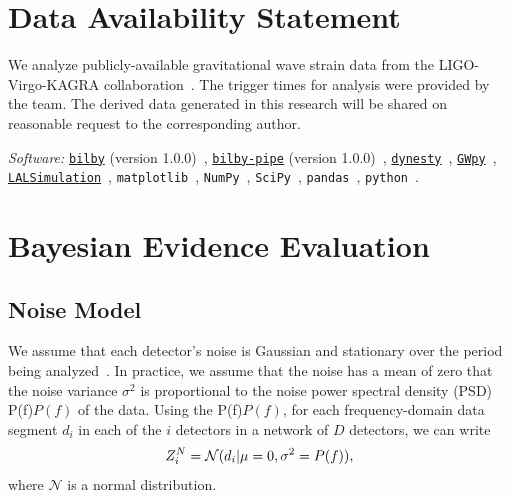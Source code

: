 \documentclass[
 nofootinbib,
 amsmath,amssymb,
 aps,
 twocolumn,
 superscriptaddress
]{revtex4-2}
\newcommand{\code}[1]{{\texttt{#1}}\xspace}
\newcommand{\bilby}{\code{bilby}}
\newcommand{\bilbypipe}{\code{bilby-pipe}}
\newcommand{\dynesty}{\code{dynesty}}
\newcommand{\gwpy}{\code{GWpy}}
\newcommand{\pycbc}{{\sc {{PyCBC}}}\xspace}
\newcommand{\mathcmd}[1]{{\sc \relax\ifmmode#1\else $#1$\fi}\xspace}
\newcommand{\psd}{\mathcmd{P(f)}}
\begin{document}
\section*{Data Availability Statement}
{
We analyze publicly-available gravitational wave strain data from the LIGO-Virgo-KAGRA collaboration~\cite{O2data}. The trigger times for analysis were provided by the \pycbc team. The derived data generated in this research will be shared on reasonable request to the corresponding author.

\textit{Software:} \href{https://lscsoft.docs.ligo.org/bilby/}{\bilby} (version 1.0.0)~\cite{bilby}, \href{https://lscsoft.docs.ligo.org/bilby_pipe/master/index.html}{\bilbypipe} (version 1.0.0)~\cite{bilby_pipe}, \href{https://dynesty.readthedocs.io/}{\dynesty}~\cite{dynesty, skilling2004, skilling2006}, \href{https://gwpy.github.io/docs/stable/index.html}{\gwpy}~\cite{gwpy}, \href{https://lscsoft.docs.ligo.org/lalsuite/lalsimulation/index.html}{\code{LALSimulation}}~\cite{lalsuite}, \code{matplotlib}~\cite{matplotlib}, \code{NumPy}~\cite{NumPy}, \code{SciPy}~\cite{SciPy}, \code{pandas}~\cite{pandas}, \code{python}~\cite{pythonForScientificComputing,pythonForScientists}. 
}



\appendix



\section{Bayesian Evidence Evaluation}\label{sec:bayesianEvidEval}

\subsection{Noise Model}
We assume that each detector's noise is Gaussian and stationary over the period being analyzed~\cite{ligo_psd}. In practice, we assume that the noise has a mean of zero that the noise variance $\sigma^2$ is proportional to the noise power spectral density (PSD) \psd of the data. Using the \psd, for each frequency-domain data segment $d_i$ in each of the $i$ detectors in a network of $D$ detectors, we can write 
\begin{equation}
\label{eq:zn}
Z^N_i = \mathcal{N}(d_i|\mu=0,\sigma^2=\psd),
\end{equation}
where $\mathcal{N}$ is a normal distribution. 
\end{document}
